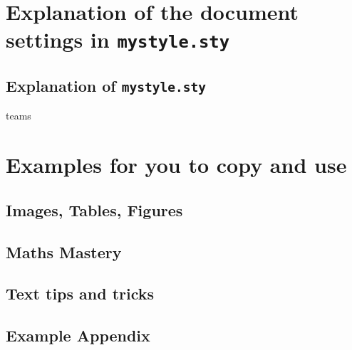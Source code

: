 \documentclass[a4paper,12pt,twoside]{report}
\begin{document}
\pagestyle{plain} %









\newpage

\newpage

\setcounter{page}{4}
\tableofcontents

\newpage
\pagestyle{exciting} %
\newpage




\part[Document settings explanation]{Explanation of the document settings in \texttt{mystyle.sty}}\label{part:part1}


\chapter{Explanation of \texttt{mystyle.sty}}\label{ch:explanation}teams



\part[Examples and explanations]{Examples for you to copy and use}
\chapter{Images, Tables, Figures}


\chapter{Maths Mastery}


\chapter{Text tips and tricks}



\newpage
\printbibliography

\newpage
\appendix
\chapter{Example Appendix}


\end{document}
